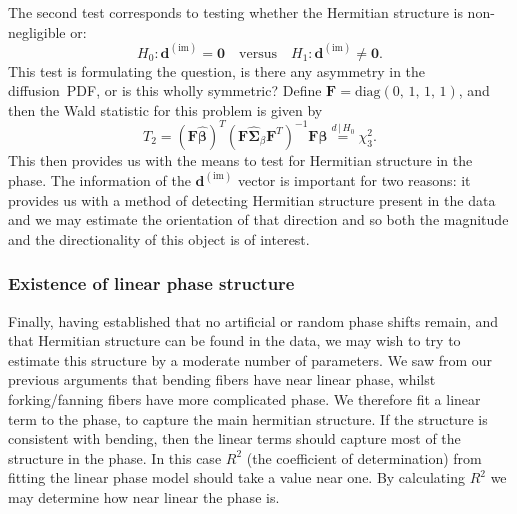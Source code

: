 \documentclass[authoryear,preprint,12pt]{elsarticle}
\newcommand{\im}{\text{im}}
\newcommand{\bF}{\mathbf{F}}
\newcommand{\bsS}{\bs{\Sigma}}
\newcommand{\bld}[1]{\mathbf{#1}}
\newcommand{\bs}[1]{\boldsymbol{#1}}
\newcommand{\wh}[1]{\widehat{#1}}
\begin{document}
The second test corresponds to testing whether the Hermitian structure
is non-negligible or:
\begin{equation}
  H_0: \bld{d}^{(\im)} = \bld{0} \quad \text{versus} \quad 
  H_1: \bld{d}^{(\im)} \neq \bld{0}. 
\end{equation}
This test is formulating the question, is there any asymmetry in the
diffusion~PDF, or is this wholly symmetric?  Define
$\bF=\text{diag}\left(0,\,1,\,1,\,1\right)$, and then the Wald
statistic for this problem is given by
\begin{equation}
  T_2 = \left(\bF\hat{\bs{\beta}}\right)^T
  \left(\bF\wh{\bsS}_{\beta}\bF^T\right)^{-1}
  \bF\hat{\bs{\beta}} \overset{d\,|\,H_0}{=} \chi^2_3.
\end{equation}
This then provides us with the means to test for Hermitian structure
in the phase.  The information of the $\bld{d}^{(\im)}$ vector is
important for two reasons: it provides us with a method of detecting
Hermitian structure present in the data and we may estimate the
orientation of that direction and so both the magnitude and the
directionality of this object is of interest.

\subsubsection{Existence of linear phase structure}

Finally, having established that no artificial or random phase shifts
remain, and that Hermitian structure can be found in the data, we may
wish to try to estimate this structure by a moderate number of
parameters.  We saw from our previous arguments that bending fibers
have near linear phase, whilst forking/fanning fibers have more
complicated phase.  We therefore fit a linear term to the phase, to
capture the main hermitian structure.  If the structure is consistent
with bending, then the linear terms should capture most of the
structure in the phase.  In this case $R^2$ (the coefficient of
determination) from fitting the linear phase model should take a value
near one.  By calculating $R^2$ we may determine how near linear the
phase is.
\end{document}
